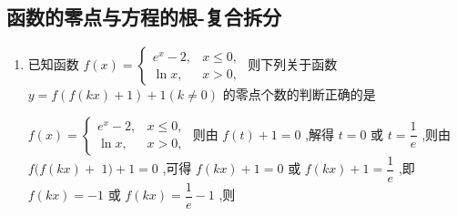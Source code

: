 \subsection*{函数的零点与方程的根-复合拆分}
\begin{enumerate}
    \item 已知函数 $f\left( x\right)  = \left\{  \begin{array}{ll} {{e}}^{x} - 2, & x \leq  0, \\  \ln x, & x > 0, \end{array}\right.$ 则下列关于函数 $y = f\left( {f\left( {kx}\right)  + 1}\right)  + 1\left( {k \neq  0}\right)$ 的零点个数的判断正确的是
    \begin{jieda}
        $f\left( x\right)  = \left\{  \begin{array}{ll} {{e}}^{x} - 2, & x \leq  0, \\  \ln x, & x > 0, \end{array}\right.$ 则由 $f\left( t\right)  + 1 = 0$ ,解得 $t = 0$ 或 $t = \dfrac{1}{{e}}$ ,则由 $f(f\left( {kx}\right)  +$  $1) + 1 = 0$ ,可得 $f\left( {kx}\right)  + 1 = 0$ 或 $f\left( {kx}\right)  + 1 = \dfrac{1}{{e}}$ ,即 $f\left( {kx}\right)  =  - 1$ 或 $f\left( {kx}\right)  = \dfrac{1}{{e}} - 1$ ,则
\end{jieda}
\end{enumerate}
